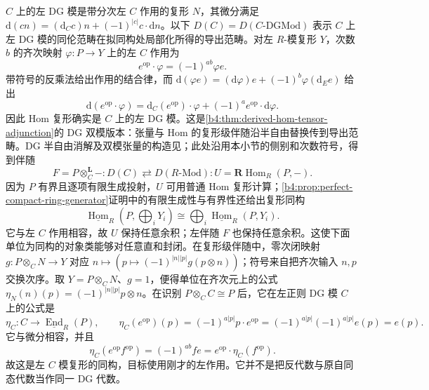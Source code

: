 \begin{proofsketch}
	\(C\) 上的左 DG 模是带分次左 \(C\) 作用的复形 \(N\)，其微分满足 \(\mathrm d(cn)=(\mathrm d_Cc)n+(-1)^{|c|}c\cdot\mathrm dn\)。以下 \(D(C)=D(C\text{-}\mathrm{DGMod})\) 表示 \(C\) 上左 DG 模的同伦范畴在拟同构处局部化所得的导出范畴。对左 \(R\)-模复形 \(Y\)，次数 \(b\) 的齐次映射 \(\varphi:P\to Y\) 上的左 \(C\) 作用为
	\[
		e^{\mathrm{op}}\cdot\varphi=(-1)^{ab}\varphi e.
	\]
	带符号的反乘法给出作用的结合律，而 \(\mathrm d(\varphi e)=(\mathrm d\varphi)e+(-1)^b\varphi(\mathrm d_Ee)\) 给出
	\[
		\mathrm d(e^{\mathrm{op}}\cdot\varphi) =\mathrm d_C(e^{\mathrm{op}})\cdot\varphi +(-1)^a e^{\mathrm{op}}\cdot\mathrm d\varphi.
	\]
	因此 Hom 复形确实是 \(C\) 上的左 DG 模。这是\cref{b4:thm:derived-hom-tensor-adjunction}的 DG 双模版本：张量与 Hom 的复形级伴随沿半自由替换传到导出范畴。DG 半自由消解及双模张量的构造见\cite[Sections 3.1 and 6.1--6.3]{Keller1994DerivingDG}；此处沿用本小节的侧别和次数符号，得到伴随
	\[
		F=P\otimes_C^{\mathbf L}-:D(C)\rightleftarrows D(R\text{-}\mathrm{Mod}):U=\mathbf R\operatorname{Hom}_R(P,-).
	\]
	因为 \(P\) 有界且逐项有限生成投射，\(U\) 可用普通 Hom 复形计算；\cref{b4:prop:perfect-compact-ring-generator}证明中的有限生成性与有界性还给出复形同构
	\[
		\underline{\operatorname{Hom}}_R\left(P,\bigoplus_iY_i\right) \cong\bigoplus_i\underline{\operatorname{Hom}}_R(P,Y_i).
	\]
	它与左 \(C\) 作用相容，故 \(U\) 保持任意余积；左伴随 \(F\) 也保持任意余积。这使下面单位为同构的对象类能够对任意直和封闭。在复形级伴随中，零次闭映射 \(g:P\otimes_CN\to Y\) 对应 \(n\mapsto(p\mapsto(-1)^{|n||p|}g(p\otimes n))\)；符号来自把齐次输入 \(n,p\) 交换次序。取 \(Y=P\otimes_CN\)、\(g=1\)，便得单位在齐次元上的公式 \(\eta_N(n)(p)=(-1)^{|n||p|}p\otimes n\)。在识别 \(P\otimes_CC\cong P\) 后，它在左正则 DG 模 \(C\) 上的公式是
	\[
		\eta_C:C\longrightarrow\underline{\operatorname{End}}_R(P), \qquad \eta_C(e^{\mathrm{op}})(p) =(-1)^{a|p|}p\cdot e^{\mathrm{op}} =(-1)^{a|p|}(-1)^{a|p|}e(p)=e(p).
	\]
	它与微分相容，并且
	\[
		\eta_C(e^{\mathrm{op}}f^{\mathrm{op}}) =(-1)^{ab}fe =e^{\mathrm{op}}\cdot\eta_C(f^{\mathrm{op}}).
	\]
	故这是左 \(C\) 模复形的同构，目标使用刚才的左作用。它并不是把反代数与原自同态代数当作同一 DG 代数。


\end{proofsketch}
